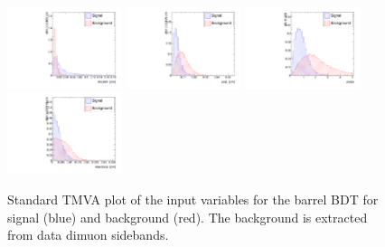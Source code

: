 \begin{figure}
  \includegraphics[width=0.3\textwidth]{Figures/docatrk_barrel}
  \includegraphics[width=0.3\textwidth]{Figures/pvip_barrel}
  \includegraphics[width=0.3\textwidth]{Figures/pvips_barrel}
  \includegraphics[width=0.3\textwidth]{Figures/maxdoca_barrel}
  \caption{Standard TMVA plot of the input variables for the barrel BDT for signal (blue) and background (red). The background is extracted from data dimuon sidebands.}
  \label{fig:TMVAPlotsBarrel}
\end{figure}

